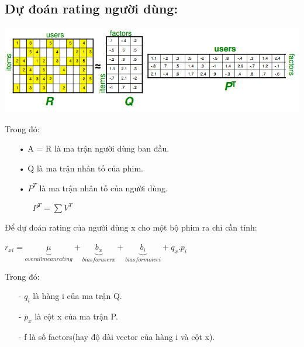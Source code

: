 \documentclass[a0,portrait,11pt]{a0poster}
\begin{document}
\begin{multicols}{2}
\begin{mybox}
\subsection*{Dự đoán rating người dùng:}
\begin{minipage}[c]{0.6\linewidth}
\includegraphics[width=20cm]{svd1.png}
\end{minipage}
\begin{minipage}[c]{0.4\linewidth}
Trong đó:
\begin{itemize}
\item[•] A = R là ma trận người dùng ban đầu.
\item[•] Q là ma trận nhân tố của phim.
\item[•] $P^T$ là ma trận nhân tố của người dùng.
\begin{itemize}
\item[] $P^T = \sum V^T$
\end{itemize}
\end{itemize}
\end{minipage}
Để dự đoán rating của người dùng x cho một bộ phim ra chỉ cần tính:
\begin{center}
\begin{center}
$r_{xi} = \underbrace{\mu}_{overall mean rating} + \underbrace{b_{x}}_{bias for user x} + \underbrace{b_{i}}_{bias for moive i} + q_{x}.p_i$
\end{center}
\end{center}
Trong đó:
\begin{itemize}
\item[-] $q_i$ là hàng i của ma trận Q.
\item[-] $p_x$ là cột x của ma trận P.
\item[-] f là số factors(hay độ dài vector của hàng i và cột x).
\end{itemize}

\end{mybox}
\end{multicols}
\end{document}
